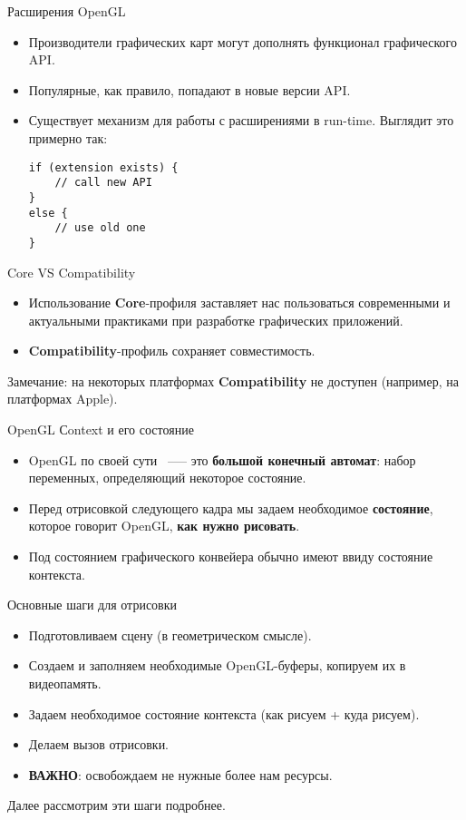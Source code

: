 \documentclass{beamer}
\begin{document}
\begin{frame}[fragile]{Расширения OpenGL}
    \begin{itemize}
        \item Производители графических карт могут дополнять функционал графического API.
        \item Популярные, как правило, попадают в новые версии API.
        \item Существует механизм для работы с расширениями в run-time.
            Выглядит это примерно так:
            {\small \begin{lstlisting}
if (extension exists) {
    // call new API
}
else {
    // use old one
}
            \end{lstlisting}}
    \end{itemize}
\end{frame}

\begin{frame}[fragile]{Core VS Compatibility}
    \begin{itemize}
        \item Использование {\bf Core}-профиля заставляет нас 
            пользоваться современными и актуальными практиками 
            при разработке графических приложений.
        \item {\bf Compatibility}-профиль сохраняет совместимость.
    \end{itemize}
    Замечание: на некоторых платформах {\bf Compatibility} 
    не доступен (например, на платформах Apple).
\end{frame}

\begin{frame}[fragile]{OpenGL Сontext и его состояние}
    \begin{itemize}
        \item OpenGL по своей сути ~--— это {\bf большой конечный автомат}: набор переменных, 
            определяющий некоторое состояние.
        \item Перед отрисовкой следующего кадра мы задаем необходимое {\bf состояние}, 
            которое говорит OpenGL, {\bf как нужно рисовать}.
        \item Под состоянием графического конвейера обычно имеют ввиду состояние контекста.
    \end{itemize}
\end{frame}

\begin{frame}[fragile]{Основные шаги для отрисовки}
    \begin{itemize}
        \item Подготовливаем сцену (в геометрическом смысле).
        \item Создаем и заполняем необходимые OpenGL-буферы, копируем их в видеопамять.
        \item Задаем необходимое состояние контекста (как рисуем + куда рисуем).
        \item Делаем вызов отрисовки.
        \item {\bf ВАЖНО}: освобождаем не нужные более нам ресурсы.
    \end{itemize}
    Далее рассмотрим эти шаги подробнее.
\end{frame}
\end{document}
